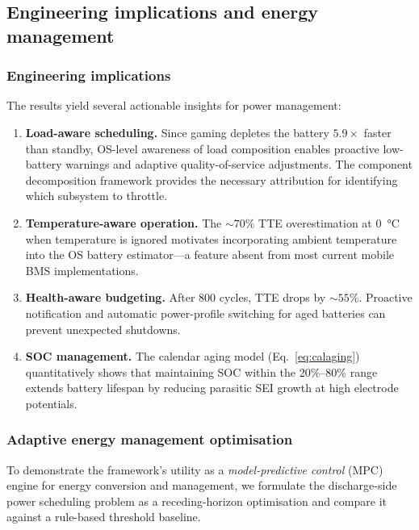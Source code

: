 \documentclass[5p,times,number]{elsarticle}
\newcommand{\eqnrefp}[1]{\textcolor{supercolor}{Eq.~\ref{#1}}}
\begin{document}
\subsection{Engineering implications and energy management}\label{sec:eng_mgmt}
\subsubsection{Engineering implications}\label{sec:engineering}
The results yield several actionable insights for power management:
\begin{enumerate}\renewcommand{\labelenumi}{(\roman{enumi})}
    \item \textbf{Load-aware scheduling.}
    Since gaming depletes the battery $5.9\times$ faster than standby, OS-level awareness of load composition enables proactive low-battery warnings and adaptive quality-of-service adjustments.
    The component decomposition framework provides the necessary attribution for identifying which subsystem to throttle.
    \item \textbf{Temperature-aware operation.}
    The $\sim 70\%$ TTE overestimation at \SI{0}{\degreeCelsius} when temperature is ignored motivates incorporating ambient temperature into the OS battery estimator---a feature absent from most current mobile BMS implementations.
    \item \textbf{Health-aware budgeting.}
    After 800 cycles, TTE drops by $\sim 55\%$.
    Proactive notification and automatic power-profile switching for aged batteries can prevent unexpected shutdowns.
    \item \textbf{SOC management.}
    The calendar aging model (\eqnrefp{eq:calaging}) quantitatively shows that maintaining SOC within the 20\%--80\% range extends battery lifespan by reducing parasitic SEI growth at high electrode potentials.
\end{enumerate}



\subsubsection{Adaptive energy management optimisation}\label{sec:energy_mgmt}
To demonstrate the framework's utility as a \emph{model-predictive control} (MPC) engine for energy conversion and management, we formulate the discharge-side power scheduling problem as a receding-horizon optimisation and compare it against a rule-based threshold baseline.
\end{document}
